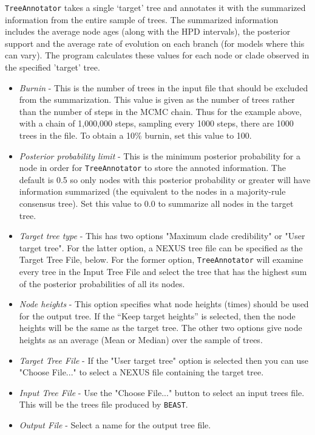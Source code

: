 \documentclass[cup7b, english]{cupbook}
\begin{document}
\texttt{TreeAnnotator} takes a single `target' tree and annotates it with the summarized
information from the entire sample of trees. The summarized information includes
the average node ages (along with the HPD intervals), the posterior
support and the average rate of evolution on each branch (for models where this
can vary). The program calculates these values for each node or clade observed in
the specified 'target' tree.

\begin{itemize}
\item \emph{Burnin} -
This is the number of trees in the input file that should be excluded from the summarization.
This value is given as the number of trees rather than the number of steps in the MCMC chain.
Thus for the example above, with a chain of 1,000,000 steps, sampling every 1000 steps, there
are 1000 trees in the file. To obtain a 10\% burnin, set this value to 100.
\item \emph{Posterior probability limit} -
This is the minimum posterior probability for a node in order for \texttt{TreeAnnotator} to store
the annoted information. The default is 0.5 so only nodes with this posterior probability
or greater will have information summarized (the equivalent to the nodes in a majority-rule
consensus tree). Set this value to 0.0 to summarize all nodes in the target tree.
\item \emph{Target tree type} -
This has two options "Maximum clade credibility" or "User target tree". For the latter option,
a NEXUS tree file can be specified as the Target Tree File, below. For the former option,
\texttt{TreeAnnotator} will examine every tree in the Input Tree File and select the tree that has
the highest sum of the posterior probabilities of all its nodes.
\item \emph{Node heights} -
This option specifies what node heights (times) should be used for the output tree. If the ``Keep
target heights'' is selected, then the node heights will be the same as the target tree. The other
two options give node heights as an average (Mean or Median) over the sample of trees.
\item \emph{Target Tree File} -
If the "User target tree" option is selected then you can use "Choose File..." to select a
NEXUS file containing the target tree.
\item \emph{Input Tree File} -
Use the "Choose File..." button to select an input trees file. This will be the trees file
produced by \texttt{BEAST}.
\item \emph{Output File} -
Select a name for the output tree file.
\end{itemize}
\end{document}

